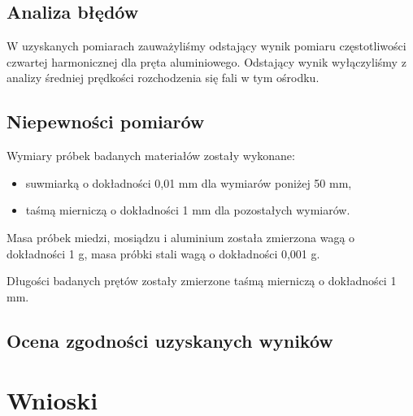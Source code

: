 \documentclass[a4paper,10pt,twoside]{article}
\begin{document}
\subsection{Analiza błędów}

W uzyskanych pomiarach zauważyliśmy odstający wynik pomiaru częstotliwości czwartej harmonicznej dla pręta aluminiowego. Odstający wynik wyłączyliśmy z analizy średniej prędkości rozchodzenia się fali w tym ośrodku.

\subsection{Niepewności pomiarów}

Wymiary próbek badanych materiałów zostały wykonane:
\begin{itemize}
  \item suwmiarką o dokładności 0,01 mm dla wymiarów poniżej 50 mm,
  \item taśmą mierniczą o dokładności 1 mm dla pozostałych wymiarów.
\end{itemize}


Masa próbek miedzi, mosiądzu i aluminium została zmierzona wagą o dokładności 1 g, masa próbki stali wagą o dokładności 0,001 g.

Długości badanych prętów zostały zmierzone taśmą mierniczą o dokładności 1 mm.



\subsection{Ocena zgodności uzyskanych wyników}

\section{Wnioski}
\end{document}
